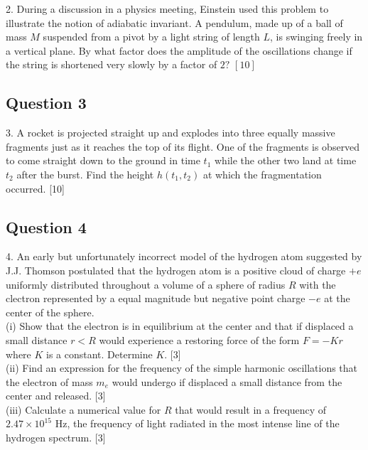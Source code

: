 \documentclass{article}
\begin{document}
2. During a discussion in a physics meeting, Einstein used this problem to illustrate the notion of adiabatic invariant. A pendulum, made up of a ball of mass $M$ suspended from a pivot by a light string of length $L$, is swinging freely in a vertical plane. By what factor does the amplitude of the oscillations change if the string is shortened very slowly by a factor of $2 ?$
$[10]$

\subsection{Question 3}
3. A rocket is projected straight up and explodes into three equally massive fragments just as it reaches the top of its flight. One of the fragments is observed to come straight down to the ground in time $t_{1}$ while the other two land at time $t_{2}$ after the burst. Find the height $h\left(t_{1}, t_{2}\right)$ at which the fragmentation occurred. [10]

\subsection{Question 4}
4. An early but unfortunately incorrect model of the hydrogen atom suggested by J.J. Thomson postulated that the hydrogen atom is a positive cloud of charge $+e$ uniformly distributed throughout a volume of a sphere of radius $R$ with the clectron represented by a equal magnitude but negative point charge $-e$ at the center of the sphere.  \\
(i) Show that the electron is in equilibrium at the center and that if displaced a small distance $r<R$ would experience a restoring force of the form $F=-K r$ where $K$ is a constant. Determine $K$. [3] \\
(ii) Find an expression for the frequency of the simple harmonic oscillations that the electron of mass $m_{e}$ would undergo if displaced a small distance from the center and released. [3] \\
(iii) Calculate a numerical value for $R$ that would result in a frequency of $2.47 \times 10^{15}$ $\mathrm{Hz}$, the frequency of light radiated in the most intense line of the hydrogen spectrum. [3]
\end{document}
